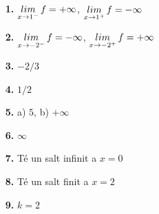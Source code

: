 \documentclass[a4paper, pdf, twoside]{book}
\begin{document}
\begin{multicols}{2}
\begin{enumerate}
\vspace{0.25cm}
\item[\fontfamily{phv}\selectfont\color{blue}\textbf{1. }]  \scalebox{0.6}{\simbolclau } 
$\mathop{lim}\limits_{x\to 1^-} f=+\infty $, $\mathop{lim}\limits_{x\to 1^+} f=-\infty $
\vspace{0.25cm}
\item[\fontfamily{phv}\selectfont\color{blue}\textbf{2. }]  \scalebox{0.6}{\simbolclau } 
$\mathop{lim}\limits_{x\to -2^-} f=-\infty $, $\mathop{lim}\limits_{x\to -2^+} f=+\infty $
\vspace{0.25cm}
\item[\fontfamily{phv}\selectfont\color{blue}\textbf{3. }]  \scalebox{0.6}{\simbolclau } 
$-2/3$
\vspace{0.25cm}
\item[\fontfamily{phv}\selectfont\color{blue}\textbf{4. }]  \scalebox{0.6}{\simbolclau } 
$1/2$
\vspace{0.25cm}
\item[\fontfamily{phv}\selectfont\color{blue}\textbf{5. }]  \scalebox{0.6}{\simbolclau } 
a) $5$, b) $+\infty $
\vspace{0.25cm}
\item[\fontfamily{phv}\selectfont\color{blue}\textbf{6. }]  \scalebox{0.6}{\simbolclau } 
$\infty $
\vspace{0.25cm}
\item[\fontfamily{phv}\selectfont\color{blue}\textbf{7. }]  \scalebox{0.6}{\simbolclau } 
Té un salt infinit a $x=0$
\vspace{0.25cm}
\item[\fontfamily{phv}\selectfont\color{blue}\textbf{8. }]  \scalebox{0.6}{\simbolclau } 
Té un salt finit a $x=2$
\vspace{0.25cm}
\item[\fontfamily{phv}\selectfont\color{blue}\textbf{9. }]  \scalebox{0.6}{\simbolclau } 
$k=2$
 \end{enumerate}
\vfill\null
\columnbreak
\end{multicols}
\def\currentname{Solucions del Tema 7}
\vspace*{0.75cm}

 

\vspace*{0.4cm}
 {}
\vspace{0.3cm}

\end{document}
